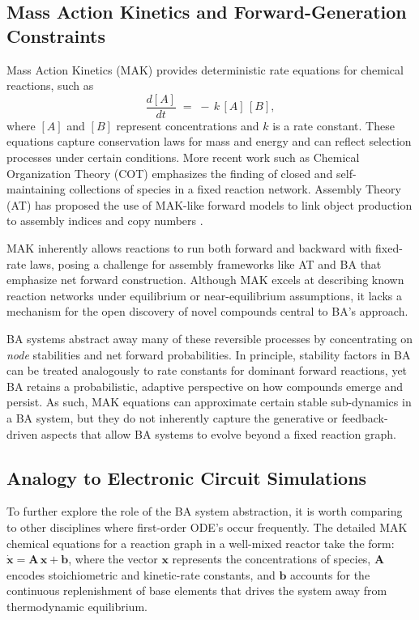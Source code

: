 \documentclass[entropy,article,submit,pdftex,moreauthors]{Definitions/mdpi}
\begin{document}
\subsection{Mass Action Kinetics and Forward-Generation Constraints}
\label{subsec:mak-forward-limitations}

Mass Action Kinetics (MAK) \cite{TuranyiTomlin2014} provides deterministic rate equations for chemical reactions, such as
\[
\frac{d[A]}{dt} \;=\; -\,k\, [A]\,[B],
\]
where $[A]$ and $[B]$ represent concentrations and $k$ is a rate constant. These equations capture conservation laws for mass and energy and can reflect selection processes under certain conditions. More recent work such as Chemical Organization Theory (COT) \cite{DittrichFenizio2005} emphasizes the finding of closed and self-maintaining collections of species in a fixed reaction network. Assembly Theory (AT) has proposed the use of MAK-like forward models to link object production to assembly indices and copy numbers \cite{walker2023nature}.

MAK inherently allows reactions to run both forward and backward with fixed-rate laws, posing a challenge for assembly frameworks like AT and BA that emphasize net forward construction. Although MAK excels at describing known reaction networks under equilibrium or near-equilibrium assumptions, it lacks a mechanism for the open discovery of novel compounds central to BA’s approach.

BA systems abstract away many of these reversible processes by concentrating on \emph{node} stabilities and net forward probabilities. In principle, stability factors in BA can be treated analogously to rate constants for dominant forward reactions, yet BA retains a probabilistic, adaptive perspective on how compounds emerge and persist. As such, MAK equations can approximate certain stable sub-dynamics in a BA system, but they do not inherently capture the generative or feedback-driven aspects that allow BA systems to evolve beyond a fixed reaction graph. 


\subsection{Analogy to Electronic Circuit Simulations}
\label{subsec:spice-analogy}

To further explore the role of the BA system abstraction, it is worth comparing to other disciplines where first-order ODE's occur frequently. The detailed MAK chemical equations for a reaction graph in a well-mixed reactor take the form:
${\dot{\mathbf{x}}} = \mathbf{A}\,\mathbf{x} + \mathbf{b}$, where the vector \(\mathbf{x}\) represents the concentrations of species, 
\(\mathbf{A}\) encodes stoichiometric and kinetic-rate constants, and 
\(\mathbf{b}\) accounts for the continuous replenishment of base elements 
that drives the system away from thermodynamic equilibrium.
\end{document}
